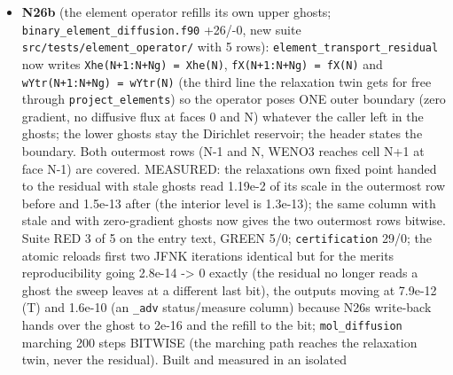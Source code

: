 \documentclass[english,a4paper]{my_memo}
\begin{document}
\begin{itemize}
  ghost and reads 1.19e-2 in both builds); \texttt{krylov\_and\_dogleg} 174/0. Advisor:
  rebuild warning-free, \texttt{steady\_newton.o} md5 \texttt{4bd3138a} and binary
  \texttt{e56609ff} identical to the worker\textquotesingle s, 174/0 and 189/0 on \texttt{build\_lwv}; one
  \texttt{neighbors} fixed. \textbf{Reported, the next small item (N26b)}: the
  relaxation solvers \texttt{solve\_trace\_element\_in\_hydrogen} and
  \texttt{element\_diffusion\_step} refill their working arrays\textquotesingle{} upper ghosts before
  every pass while \texttt{element\_transport\_residual}, documented as the same
  operator, reads the ghost from \texttt{f\_sp} with no refill, so the operator\textquotesingle s
  boundary depends on its caller (\texttt{binary\_element\_diffusion.f90}, two lines).
  Not claimed: convergence; an explanation of the collapse of the outermost
  cells to 1e-11 of the reservoir.
\item
  \textbf{N26b} (the element operator refills its own upper ghosts;
  \texttt{binary\_element\_diffusion.f90} +26/-0, new suite \texttt{src/tests/element\_operator/}
  with 5 rows): \texttt{element\_transport\_residual} now writes \texttt{Xhe(N+1:N+Ng)\ =\ Xhe(N)}, \texttt{fX(N+1:N+Ng)\ =\ fX(N)} and \texttt{wYtr(N+1:N+Ng)\ =\ wYtr(N)} (the third
  line the relaxation twin gets for free through \texttt{project\_elements}) so the
  operator poses ONE outer boundary (zero gradient, no diffusive flux at
  faces 0 and N) whatever the caller left in the ghosts; the lower ghosts
  stay the Dirichlet reservoir; the header states the boundary. Both
  outermost rows (N-1 and N, WENO3 reaches cell N+1 at face N-1) are covered.
  MEASURED: the relaxation\textquotesingle s own fixed point handed to the residual with
  stale ghosts read 1.19e-2 of its scale in the outermost row before and
  1.5e-13 after (the interior level is 1.3e-13); the same column with stale
  and with zero-gradient ghosts now gives the two outermost rows bitwise.
  Suite RED 3 of 5 on the entry text, GREEN 5/0; \texttt{certification} 29/0; the
  atomic reload\textquotesingle s first two JFNK iterations identical but for the merit\textquotesingle s
  reproducibility going 2.8e-14 -\textgreater{} 0 exactly (the residual no longer reads
  a ghost the sweep leaves at a different last bit), the outputs moving at
  7.9e-12 (T) and 1.6e-10 (an \texttt{\_adv} status/measure column) because N26\textquotesingle s
  write-back hands over the ghost to 2e-16 and the refill to the bit;
  \texttt{mol\_diffusion} marching 200 steps BITWISE (the marching path reaches the
  relaxation twin, never the residual). Built and measured in an isolated

\end{itemize}
\end{document}
